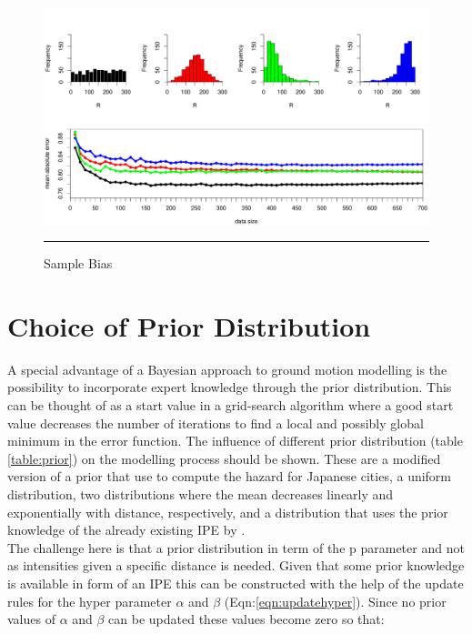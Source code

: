 \begin{figure}[!htpb]
    \centering
		\includegraphics[scale=0.33]{Figures/sampleBias.pdf}
		\rule{35em}{0.5pt}
	\caption[Sample Bias]{Sample Bias}
	\label{fig:sampleBias}
\end{figure}



\section{Choice of Prior Distribution}

A special advantage of a Bayesian approach to ground motion modelling is the possibility to incorporate expert knowledge through the prior distribution. This can be thought of as a start value in a grid-search algorithm where a good start value decreases the number of iterations to find a local and possibly global minimum in the error function. The influence of different prior distribution (table \ref{table:prior}) on the modelling process should be shown. These are a modified version of a prior that \cite{Tsapanos2002} use to compute the hazard for Japanese cities, a uniform distribution, two distributions where the mean decreases linearly and exponentially with distance, respectively, and a distribution that uses the prior knowledge of the already existing IPE by \cite{Koveslighety1906}.\\
The challenge here is that a prior distribution in term of the p parameter and not as intensities given a specific distance is needed. Given that some prior knowledge is available in form of an IPE this can be constructed with the help of the update rules for the hyper parameter $\alpha$ and $\beta$ (Eqn:\ref{eqn:updatehyper}). Since no prior values of $\alpha$ and $\beta$ can be updated these values become zero so that:

